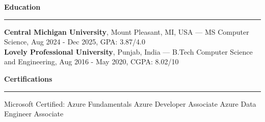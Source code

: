 \documentclass[10pt,letterpaper]{article}
\newcommand{\ressection}[1]{\vspace{2.6pt}\par\textbf{#1}\par\vspace{0.8pt}\hrule\vspace{1.6pt}}
\begin{document}
\ressection{Education}
\textbf{Central Michigan University}, Mount Pleasant, MI, USA --- MS Computer Science, Aug 2024 - Dec 2025, GPA: 3.87/4.0\\
\textbf{Lovely Professional University}, Punjab, India --- B.Tech Computer Science and Engineering, Aug 2016 - May 2020, CGPA: 8.02/10

\ressection{Certifications}
Microsoft Certified: Azure Fundamentals \textbar{} Azure Developer Associate \textbar{} Azure Data Engineer Associate
\end{document}
